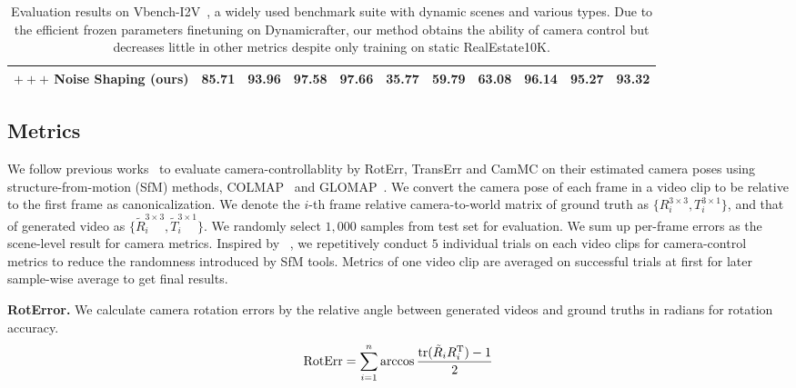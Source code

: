 \begin{table*}[ht!]
{\begin{tabular}{|l|c|cccccc|ccc|}
            $+++$ Noise Shaping (ours)             & \textbf{85.71} & 93.96 & 97.58 & 97.66 & 35.77 & \textbf{59.79} & \textbf{63.08} & \textbf{96.14} & 95.27 & \textbf{93.32} \\
            \bottomrule
      \end{tabular}
    }
  \vspace{-.1cm}
  \caption{Evaluation results on Vbench-I2V~\cite{huang2024vbench++}, a widely used benchmark suite with dynamic scenes and various types. Due to the efficient frozen parameters finetuning on Dynamicrafter, our method obtains the ability of camera control but decreases little in other metrics despite only training on static RealEstate10K.}
  \label{tab:rebuttal_Vbench-I2V}
  \vspace{-.1cm}
\end{table*}

\subsection{Metrics}

We follow previous works~\cite{Wang2024Motionctrl, He2024Cameractrl, xu2024camco, zheng2024cami2v} to evaluate camera-controllablity by RotErr, TransErr and CamMC on their estimated camera poses using structure-from-motion (SfM) methods, \eg COLMAP~\cite{Schonberger2016} and GLOMAP~\cite{pan2024glomap}.
We convert the camera pose of each frame in a video clip to be relative to the first frame as canonicalization.
We denote the \(i\)-th frame relative camera-to-world matrix of ground truth as \(\{R^{3\times3}_i,T^{3\times1}_i\}\), and that of generated video as \(\{\tilde{R}^{3\times3}_i,\tilde{T}^{3\times1}_i\}\).
We randomly select \(1,000\) samples from test set for evaluation.
We sum up per-frame errors as the scene-level result for camera metrics.
Inspired by ~\citet{zheng2024cami2v}, we repetitively conduct \(5\) individual trials on each video clips for camera-control metrics to reduce the randomness introduced by SfM tools.
Metrics of one video clip are averaged on successful trials at first for later sample-wise average to get final results.

\noindent\textbf{RotError.} We calculate camera rotation errors by the relative angle between generated videos and ground truths in radians for rotation accuracy. 
\begin{equation}
    {\rm RotErr} = \sum_{i=1}^n \arccos{\frac{\mathop{\rm tr}(\tilde{R}_i R_i^{\rm T}) - 1}{2}}    
\end{equation}

